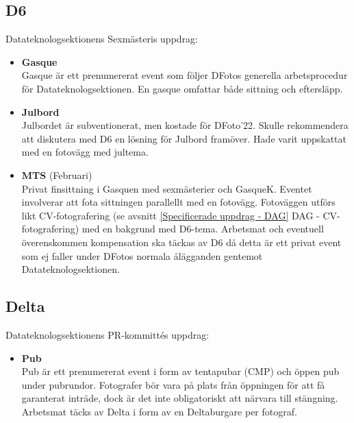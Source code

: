 \subsection{D6}
Datateknologsektionens Sexmästeris uppdrag:
\begin{itemize}
    \item \textbf{Gasque} \\
    Gasque är ett prenumererat event som följer DFotos generella arbetsprocedur för Datateknologsektionen. En gasque omfattar både sittning och eftersläpp. 
    \item \textbf{Julbord} \\
    Julbordet är subventionerat, men kostade för DFoto'22. Skulle rekommendera att diskutera med D6 en lösning för Julbord framöver. Hade varit uppskattat med en fotovägg med jultema.  
    \item \textbf{MTS} (Februari)\\
    Privat finsittning i Gasquen med sexmästerier och GasqueK. Eventet involverar att fota sittningen parallellt med en fotovägg. Fotoväggen utförs likt CV-fotografering (se avsnitt \ref{Specificerade uppdrag - DAG} DAG - CV-fotografering) med en bakgrund med D6-tema. Arbetsmat och eventuell överenskommen kompensation ska täckas av D6 då detta är ett privat event som ej faller under DFotos normala ålägganden gentemot Datateknologsektionen. 
\end{itemize}

\subsection{Delta}
Datateknologsektionens PR-kommittés uppdrag: 
\begin{itemize}
    \item \textbf{Pub}\\
    Pub är ett prenumererat event i form av tentapubar (CMP) och öppen pub under pubrundor. Fotografer bör vara på plats från öppningen för att få garanterat inträde, dock är det inte obligatoriskt att närvara till stängning. Arbetsmat täcks av Delta i form av en Deltaburgare per fotograf.  
    
\end{itemize}

